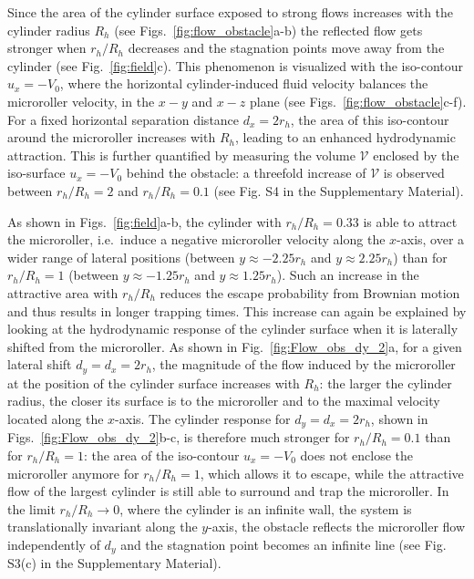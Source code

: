 \documentclass[12pt]{article}
\begin{document}
Since the area of the cylinder surface exposed to strong flows increases with the cylinder radius $R_h$ (see Figs.~\ref{fig:flow_obstacle}a-b) the reflected flow gets stronger when $r_h/R_h$ decreases and the stagnation points move away from the cylinder (see Fig.~\ref{fig:field}c).  This phenomenon is visualized with the iso-contour  $u_x=-V_0$,  where the horizontal cylinder-induced fluid velocity  balances the microroller velocity, in the $x-y$ and $x-z$ plane (see Figs.~\ref{fig:flow_obstacle}c-f).  For a fixed horizontal separation distance $d_x=2r_h$, the area of this iso-contour around the microroller increases with $R_h$, leading to an enhanced hydrodynamic attraction. This is further quantified by measuring the volume $\mathcal{V}$ enclosed by the iso-surface $u_x=-V_0$ behind the obstacle: a threefold increase of $\mathcal{V}$ is observed between $r_h/R_h=2$ and  $r_h/R_h=0.1$ (see Fig. S4 in the Supplementary Material). 



As shown in Figs.~\ref{fig:field}a-b, the cylinder with $r_h/R_h = 0.33$ is able to attract the microroller, i.e.\ induce a negative microroller velocity along the $x$-axis, over a wider range of lateral positions (between $y \approx -2.25r_h$ and $y \approx 2.25r_h$) than for $r_h/R_h = 1$ (between $y \approx -1.25r_h$ and $y \approx 1.25r_h$). Such an increase in the attractive area with $r_h/R_h$ reduces the escape probability from Brownian motion and thus results in longer trapping times.  This increase  can again be explained by looking at the hydrodynamic response of the cylinder surface when it is laterally shifted from the microroller. As shown in Fig.~\ref{fig:Flow_obs_dy_2}a, for a given lateral shift $d_y = d_x = 2r_h$, the magnitude of the flow induced by the microroller at the position of the cylinder surface increases with $R_h$: the larger the cylinder radius, the closer its surface is to the microroller and to the maximal velocity located along the $x$-axis. 
The cylinder response for $d_y = d_x =2r_h$, shown in Figs.~\ref{fig:Flow_obs_dy_2}b-c, is therefore much stronger for $r_h/R_h=0.1$ than for $r_h/R_h=1$: the area of the iso-contour $u_x = -V_0$ does not enclose the microroller anymore for $r_h/R_h=1$, which allows it to escape, while the attractive flow of the largest cylinder is still able to surround  and trap the microroller. 
 In the limit $r_h/R_h\rightarrow 0$, where the cylinder is an infinite wall, the system is translationally invariant along the $y$-axis, the obstacle reflects the microroller flow independently of $d_y$ and the stagnation point becomes an infinite line (see Fig. S3(c) in the Supplementary Material).
\end{document}
